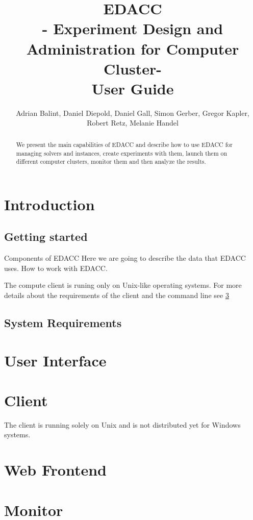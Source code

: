 \documentclass[twoside,a4paper]{refart}
\title{EDACC \\ - Experiment Design and Administration for Computer Cluster- \\User Guide}
\author{Adrian Balint, Daniel Diepold, Daniel Gall, Simon Gerber, Gregor Kapler, Robert Retz, Melanie Handel }
\date{}
\begin{document}
\maketitle

\begin{abstract}
        We present the main capabilities of EDACC and describe how to use EDACC for managing solvers and instances, create experiments with them, launch them on different computer clusters, monitor them and then analyze the results. 
\end{abstract}


\tableofcontents

\newpage



\section{Introduction}

\subsection{Getting started}
Components of EDACC
Here we are going to describe the data that EDACC uses.
How to work with EDACC.

The compute client is runing only on Unix-like operating systems. 
For more details  about the requirements of the client and the command line see \ref{client}



\subsection{System Requirements}
\section{User Interface}
\section{Client}
\label{client}
\attention The client is running solely on Unix and is not distributed yet for Windows systems.
\section{Web Frontend}
\section{Monitor}




\printindex
\end{document}
